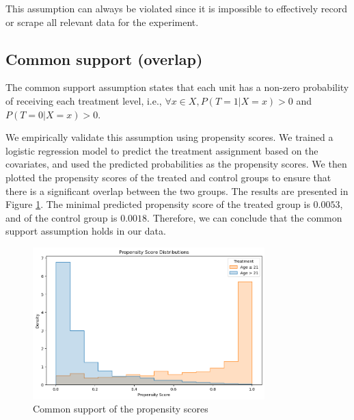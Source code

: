 \documentclass[11pt]{article}
\newcommand{\gur}[1]{{\color{teal}{Gur: #1}}}
\begin{document}
\gur{'We close with a reminder to readers of the optimistic view of the complexity of data and how correlation between observed variables and unmeasured ones can reduce any bias associated with unmeasured information.' https://www.ncbi.nlm.nih.gov/pmc/articles/PMC10666970/}

This assumption can always be violated since it is impossible to effectively record or scrape all relevant data for the experiment. 

\subsection{Common support (overlap)}

The common support assumption states that each unit has a non-zero probability of receiving each treatment level, i.e., $\forall x \in X, P(T=1|X=x) > 0$ and $P(T=0|X=x) > 0$.

We empirically validate this assumption using propensity scores. We trained a logistic regression model to predict the treatment assignment based on the covariates, and used the predicted probabilities as the propensity scores. We then plotted the propensity scores of the treated and control groups to ensure that there is a significant overlap between the two groups. The results are presented in Figure \ref{fig:common_support}. The minimal predicted propensity score of the treated group is $0.0053$, and of the control group is $0.0018$. Therefore, we can conclude that the common support assumption holds in our data.

\begin{figure}
    \centering
    \caption{Common support of the propensity scores}
    \label{fig:common_support}
    \includegraphics[width = 0.8\textwidth]{images/common support propensity graph.png}
\end{figure}
\end{document}
